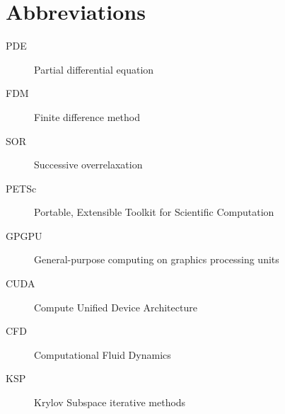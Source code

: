 \chapter{Abbreviations}

\begin{description}
	\item[PDE] Partial differential equation
	\item[FDM] Finite difference method
	\item[SOR] Successive overrelaxation
	\item[PETSc] Portable, Extensible Toolkit for Scientific Computation
	\item[GPGPU] General-purpose computing on graphics processing units
	\item[CUDA] Compute Unified Device Architecture
	\item[CFD] Computational Fluid Dynamics
	\item[KSP] Krylov Subspace iterative methods
\end{description}
